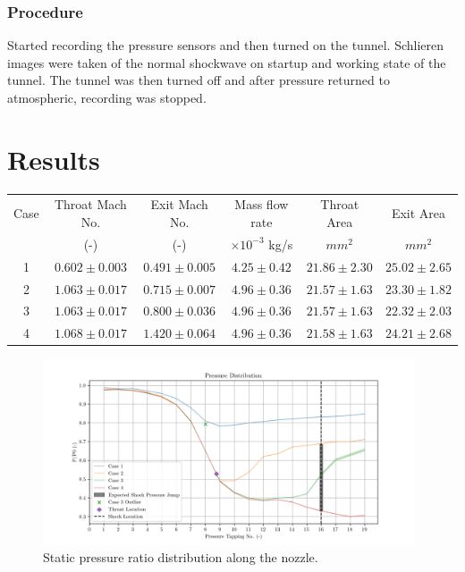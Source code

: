 \documentclass{article}
\begin{document}
\subsubsection{Procedure}

Started recording the pressure sensors and then turned on the tunnel.
Schlieren images were taken of the normal shockwave on startup and working state of the tunnel.
The tunnel was then turned off and after pressure returned to atmospheric, recording was stopped.

\section{Results}

\begin{center}
    \begin{tabular}{|c|c|c|c|c|c|}
    \hline 
    Case & Throat Mach No.  & Exit Mach No. & Mass flow rate & Throat Area & Exit Area\\
     & (-) & (-) & $\times 10^{-3}$ kg/s & $mm^2$ & $mm^2$ \\
    \hline 
    1 & $0.602\pm 0.003$ & $0.491\pm 0.005$ & $ 4.25\pm 0.42  $ & $21.86 \pm 2.30 $ & $25.02 \pm 2.65 $ \\
    2 & $1.063\pm 0.017$ & $0.715\pm 0.007$ & $ 4.96\pm 0.36  $ & $21.57 \pm 1.63 $ & $23.30 \pm 1.82 $ \\
    3 & $1.063\pm 0.017$ & $0.800\pm 0.036$ & $ 4.96\pm 0.36 $ & $21.57 \pm 1.63 $ & $22.32 \pm 2.03 $ \\
    4 & $1.068\pm 0.017$ & $1.420\pm 0.064$ & $ 4.96\pm 0.36 $ & $21.58 \pm 1.63 $ & $24.21 \pm 2.68 $ \\
    \hline
    \end{tabular}
    \label{tab:1}
\end{center}

\begin{figure}[H]
    \centering
    \includegraphics[width=0.98\textwidth]{../Supersonic_Nozzle/pressure_ratio_distribution_corrected.png}
    \caption{Static pressure ratio distribution along the nozzle.}
    \label{fig:pressure_distribution}
\end{figure}
\end{document}
